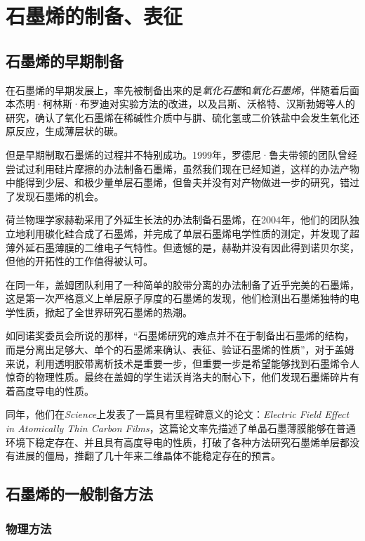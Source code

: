 
\chapter{石墨烯的制备、表征}

\section{石墨烯的早期制备}

在石墨烯的早期发展上，率先被制备出来的是\textit{氧化石墨}和\textit{氧化石墨烯}，伴随着后面本杰明·柯林斯·布罗迪对实验方法的改进，以及吕斯、沃格特、汉斯勃姆等人的研究，确认了氧化石墨烯在稀碱性介质中与肼、硫化氢或二价铁盐中会发生氧化还原反应，生成薄层状的碳。

但是早期制取石墨烯的过程并不特别成功。1999年，罗德尼·鲁夫带领的团队曾经尝试过利用硅片摩擦的办法制备石墨烯，虽然我们现在已经知道，这样的办法产物中能得到少层、和极少量单层石墨烯，但鲁夫并没有对产物做进一步的研究，错过了发现石墨烯的机会。

荷兰物理学家赫勒采用了外延生长法的办法制备石墨烯，在2004年，他们的团队独立地利用碳化硅合成了石墨烯，并完成了单层石墨烯电学性质的测定，并发现了超薄外延石墨薄膜的二维电子气特性。但遗憾的是，赫勒并没有因此得到诺贝尔奖，但他的开拓性的工作值得被认可。

在同一年，盖姆团队利用了一种简单的胶带分离的办法制备了近乎完美的石墨烯，这是第一次严格意义上单层原子厚度的石墨烯的发现，他们检测出石墨烯独特的电学性质，掀起了全世界研究石墨烯的热潮。

如同诺奖委员会所说的那样，“石墨烯研究的难点并不在于制备出石墨烯的结构，而是分离出足够大、单个的石墨烯来确认、表征、验证石墨烯的性质”，对于盖姆来说，利用透明胶带离析技术是重要一步，但重要一步是希望能够找到石墨烯令人惊奇的物理性质。最终在盖姆的学生诺沃肖洛夫的耐心下，他们发现石墨烯碎片有着高度导电的性质。

同年，他们在\textit{Science}上发表了一篇具有里程碑意义的论文：\textit{Electric Field Effect in Atomically Thin Carbon Films}，这篇论文率先描述了单晶石墨薄膜能够在普通环境下稳定存在、并且具有高度导电的性质，打破了各种方法研究石墨烯单层都没有进展的僵局，推翻了几十年来二维晶体不能稳定存在的预言。

\section{石墨烯的一般制备方法}

\subsection{物理方法}

